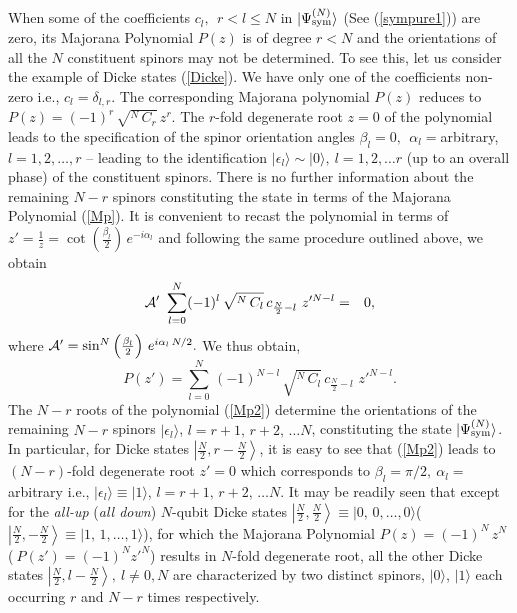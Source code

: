 \documentclass[pra,preprint,a4paper,superscriptaddress]{revtex4}
\begin{document}
{When some of the coefficients $c_l,\ \  r< l\leq N$ in $\vert \Psi^{(N)}_{\rm sym}\rangle$ (See (\ref{sympure1})) are zero, its Majorana Polynomial 
$P(z)$ is of degree $r<N$ and the orientations of all the $N$ constituent spinors may not be determined. To see this, let us consider the example of Dicke states (\ref{Dicke}). We have only one of the coefficients non-zero i.e., $c_l=\delta_{l,r}$.  The corresponding Majorana polynomial $P(z)$ reduces to  $P(z)=(-1)^r\, \sqrt{^N\, C_r}\, z^{r}$. The $r$-fold degenerate root  $z=0$ of the polynomial leads to the specification of the spinor orientation angles $\beta_l=0,\ \ \alpha_l=$arbitrary, $l=1,2,\ldots, r$ -- leading to the identification $\vert\epsilon_l\rangle\sim \vert 0\rangle,\ l=1,2,\ldots r$ (up to an overall phase) of the constituent spinors. There is no further information about the remaining $N-r$ spinors constituting the state in terms of the Majorana Polynomial (\ref{Mp}).  It is convenient to recast the  polynomial in terms of $z'=\frac{1}{z}=\cot \left(\frac{\beta_l}{2}\right)\,e^{-i\alpha_l}$ and following the same procedure outlined above, we obtain 
\begin{eqnarray}
\label{cmj03}
{\cal A'}\  \sum_{l=0}^N (-1)^l\,\sqrt{^N\, C_l}\,  c_{\frac{N}{2}-l}\,  \, z'^{N-l}&=&0,  
\end{eqnarray} 
where  ${\cal A'}=\sin^N\left(\frac{\beta_l}{2}\right)\,e^{i\alpha_l\, N/2}.$ We thus obtain, 
\begin{equation} 
\label{Mp2}
P(z')=\sum_{l=0}^N\, (-1)^{N-l}\, \sqrt{^N\, C_l}\,  c_{\frac{N}{2}-l}\,  \, z'^{N-l}.
\end{equation}
The $N-r$ roots of the  polynomial (\ref{Mp2}) determine the orientations of the remaining $N-r$ spinors $\vert\epsilon_l\rangle$, $l=r+1,\,r+2,\,\ldots N$, constituting the state $\vert \Psi^{(N)}_{\rm sym}\rangle$. In particular, for Dicke states $\left\vert \frac{N}{2},r-\frac{N}{2}\right\rangle$, it is easy to see that (\ref{Mp2}) leads to $(N-r)$-fold degenerate root $z'=0$ which corresponds to 
$\beta_l=\pi/2,\ \alpha_l=$ arbitrary i.e., $\vert \epsilon_l \rangle \equiv \vert 1 \rangle$, $l=r+1,\,r+2,\, \ldots N$. 
It may be readily seen that except for the  {\em all-up} ({\em all down}) $N$-qubit Dicke states $\left\vert \frac{N}{2}, \frac{N}{2}\right\rangle\equiv \vert 0,\,0,\ldots,0\rangle$( $\left\vert \frac{N}{2},-\frac{N}{2}\right\rangle\equiv \vert 1,\,1,\ldots,1 \rangle$), for which the Majorana Polynomial  $P(z)=(-1)^N\, z^N$ ($\ P(z')=(-1)^N z'^{N}$) results in $N$-fold degenerate root,  
 all the other  Dicke states $\left\vert \frac{N}{2},l-\frac{N}{2}\right\rangle,\ l\neq 0, N$ are characterized by two distinct spinors, $\vert 0\rangle$, $\vert 1 \rangle$ each occurring $r$ and $N-r$ times respectively. 

}
\end{document}
